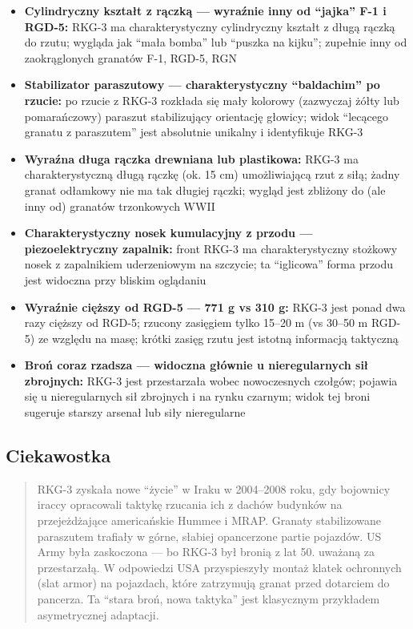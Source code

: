 \documentclass[12pt,oneside]{book}
\providecommand{\tightlist}{%
  \setlength{\itemsep}{0pt}\setlength{\parskip}{0pt}}
\begin{document}
\begin{itemize}
\tightlist
\item
  \textbf{Cylindryczny kształt z rączką --- wyraźnie inny od ``jajka''
  F-1 i RGD-5:} RKG-3 ma charakterystyczny cylindryczny kształt z długą
  rączką do rzutu; wygląda jak ``mała bomba'' lub ``puszka na kijku'';
  zupełnie inny od zaokrąglonych granatów F-1, RGD-5, RGN
\item
  \textbf{Stabilizator paraszutowy --- charakterystyczny ``baldachim''
  po rzucie:} po rzucie z RKG-3 rozkłada się mały kolorowy (zazwyczaj
  żółty lub pomarańczowy) paraszut stabilizujący orientację głowicy;
  widok ``lecącego granatu z paraszutem'' jest absolutnie unikalny i
  identyfikuje RKG-3
\item
  \textbf{Wyraźna długa rączka drewniana lub plastikowa:} RKG-3 ma
  charakterystyczną długą rączkę (ok. 15 cm) umożliwiającą rzut z siłą;
  żadny granat odłamkowy nie ma tak długiej rączki; wygląd jest zbliżony
  do (ale inny od) granatów trzonkowych WWII
\item
  \textbf{Charakterystyczny nosek kumulacyjny z przodu ---
  piezoelektryczny zapalnik:} front RKG-3 ma charakterystyczny stożkowy
  nosek z zapalnikiem uderzeniowym na szczycie; ta ``iglicowa'' forma
  przodu jest widoczna przy bliskim oglądaniu
\item
  \textbf{Wyraźnie cięższy od RGD-5 --- 771 g vs 310 g:} RKG-3 jest
  ponad dwa razy cięższy od RGD-5; rzucony zasięgiem tylko 15--20 m (vs
  30--50 m RGD-5) ze względu na masę; krótki zasięg rzutu jest istotną
  informacją taktyczną
\item
  \textbf{Broń coraz rzadsza --- widoczna głównie u nieregularnych sił
  zbrojnych:} RKG-3 jest przestarzała wobec nowoczesnych czołgów;
  pojawia się u nieregularnych sił zbrojnych i na rynku czarnym; widok
  tej broni sugeruje starszy arsenał lub siły nieregularne
\end{itemize}

\subsection{Ciekawostka}\label{ciekawostka-120}

\begin{quote}
RKG-3 zyskała nowe ``życie'' w Iraku w 2004--2008 roku, gdy bojownicy
iraccy opracowali taktykę rzucania ich z dachów budynków na
przejeżdżające americańskie Hummee i MRAP. Granaty stabilizowane
paraszutem trafiały w górne, słabiej opancerzone partie pojazdów. US
Army była zaskoczona --- bo RKG-3 był bronią z lat 50. uważaną za
przestarzałą. W odpowiedzi USA przyspieszyły montaż klatek ochronnych
(slat armor) na pojazdach, które zatrzymują granat przed dotarciem do
pancerza. Ta ``stara broń, nowa taktyka'' jest klasycznym przykładem
asymetrycznej adaptacji.
\end{quote}
\end{document}
